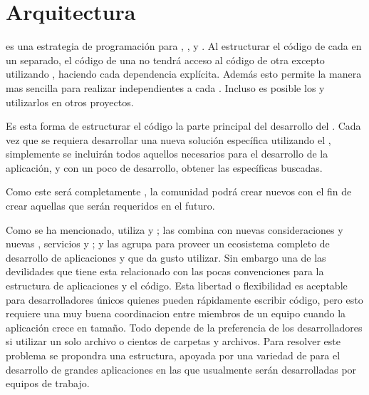 \section{Arquitectura}\label{cap:arquitectura:section:generic_arquitectura}

\packagesAS es una estrategia de programación para \codeSeparationQA, \modularityAS, y \reusabilityQA. Al estructurar el código de cada \featureCPT en un \packagesAS separado, el código de una \featureCPT no tendrá acceso al código de otra \featureCPT excepto utilizando \exportCPT, haciendo cada dependencia explícita. Además esto permite la manera mas sencilla para realizar \testingCPT independientes a cada \featureCPT. Incluso es posible \publishINT los \packagesAS y utilizarlos en otros proyectos.

Es esta forma de estructurar el código la parte principal del desarrollo del \frameworkPC \ecommerceCOM. Cada vez que se requiera desarrollar una nueva solución específica utilizando el \frameworkPC, simplemente se incluirán todos aquellos \modulesAS necesarios para el desarrollo de la aplicación, y con un poco de desarrollo, obtener las \featuresCPT específicas buscadas.

Como este \frameworkPC será completamente \openSourcePC, la comunidad podrá crear nuevos \modulesAS con el fin de crear aquellas \featuresCPT que serán requeridos en el futuro.



Como se ha mencionado, \meteorNAME utiliza \librariesPC y \toolsCPT; las combina con nuevas consideraciones y nuevas \librariesPC, servicios y \standards; y las agrupa para proveer un ecosistema completo de desarrollo de aplicaciones \webINT y \mobileINT que da gusto utilizar. Sin embargo una de las devilidades que tiene 	\meteorNAME esta relacionado con las pocas convenciones para la estructura de aplicaciones y el código. Esta libertad o flexibilidad es aceptable para desarrolladores únicos quienes pueden rápidamente escribir código, pero esto requiere una muy buena coordinacion entre miembros de un equipo cuando la aplicación crece en tamaño. Todo depende de la preferencia de los desarrolladores si utilizar un solo archivo o cientos de carpetas y archivos. Para resolver este problema se propondra una estructura, apoyada por una variedad de \packagesAS para el desarrollo de grandes aplicaciones en las que usualmente serán desarrolladas por equipos de trabajo.

